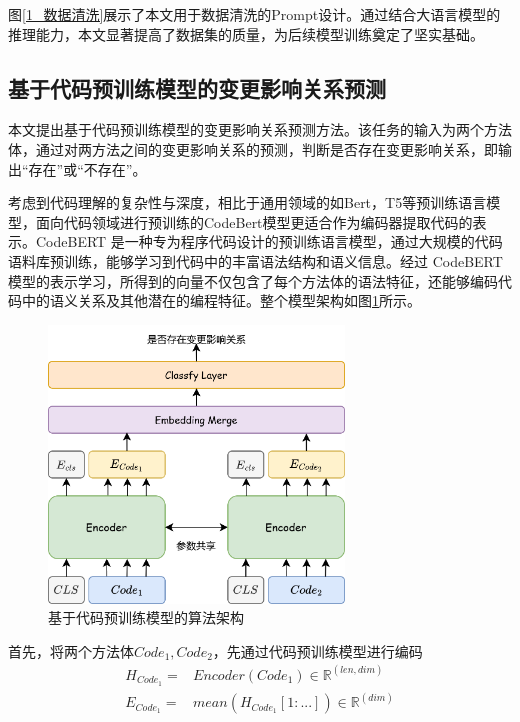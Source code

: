 图\ref{1_数据清洗}展示了本文用于数据清洗的Prompt设计。通过结合大语言模型的推理能力，本文显著提高了数据集的质量，为后续模型训练奠定了坚实基础。


\subsection{基于代码预训练模型的变更影响关系预测}

本文提出基于代码预训练模型的变更影响关系预测方法。该任务的输入为两个方法体，通过对两方法之间的变更影响关系的预测，判断是否存在变更影响关系，即输出“存在”或“不存在”。

考虑到代码理解的复杂性与深度，相比于通用领域的如Bert，T5等预训练语言模型，面向代码领域进行预训练的CodeBert模型更适合作为编码器提取代码的表示。CodeBERT 是一种专为程序代码设计的预训练语言模型，通过大规模的代码语料库预训练，能够学习到代码中的丰富语法结构和语义信息。经过 CodeBERT 模型的表示学习，所得到的向量不仅包含了每个方法体的语法特征，还能够编码代码中的语义关系及其他潜在的编程特征。整个模型架构如图\ref{1_code_bert_overall}所示。
\vspace{0mm}
\begin{figure}[h]
\centering
\includegraphics[width = 0.70\textwidth]{figures/1_code_bert_overall.png}
\caption{基于代码预训练模型的算法架构}
\label{1_code_bert_overall}
\end{figure}


首先，将两个方法体$ Code_1, Code_2$，先通过代码预训练模型进行编码
\begin{align}
H_{Code_1}=&Encoder(Code_1) \in \mathbb{R}^{(len,dim)} \\
E_{Code_1}=&mean(H_{Code_1}[1:...]) \in \mathbb{R}^{(dim)}
\end{align}

